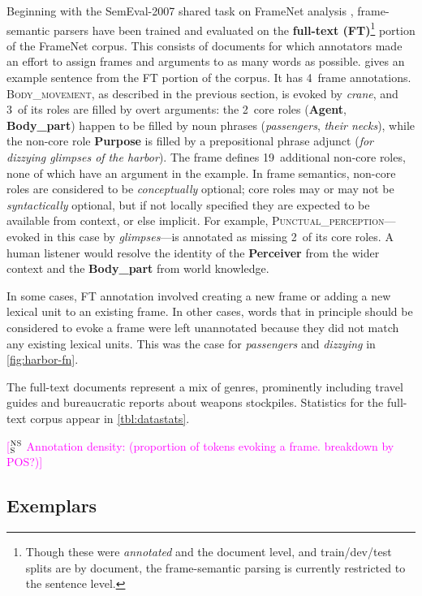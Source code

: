 \documentclass[11pt,a4paper]{article}
\newcommand{\ensuretext}[1]{#1}
\newcommand{\nssmarker}{\ensuretext{\textcolor{magenta}{\ensuremath{^{\textsc{NS}}_{\textsc{S}}}}}}
\newcommand{\arkcomment}[3]{\ensuretext{\textcolor{#3}{[#1 #2]}}}
\newcommand{\nss}[1]{\arkcomment{\nssmarker}{#1}{magenta}}
\newcommand{\fnf}[1]{\textsc{\textsf{#1}}} %
\newcommand{\fnr}[1]{\textbf{\textsf{#1}}} %
\begin{document}
Beginning with the SemEval-2007 shared task on FrameNet analysis \citep{baker-07},
frame-semantic parsers have been trained and evaluated on the \textbf{full-text (FT)}\footnote{Though these 
were \emph{annotated} and the document level, and train/dev/test splits are by document, the frame-semantic parsing 
is currently restricted to the sentence level.} portion 
of the FrameNet corpus. This consists of documents for which annotators made an effort 
to assign frames and arguments to as many words as possible. 
 gives an example sentence from the FT portion of the corpus. 
It has 4~frame annotations. \fnf{Body\_movement}, as described in the previous section, 
is evoked by \textit{crane}, and 3~of its roles are filled by overt arguments: 
the 2~core roles (\fnr{Agent}, \fnr{Body\_part}) happen to be filled by noun phrases 
(\textit{passengers}, \textit{their necks}), while the non-core role \fnr{Purpose} is filled by a 
prepositional phrase adjunct (\textit{for dizzying glimpses of the harbor}).
The frame defines 19~additional non-core roles, none of which have an argument in the example.
In frame semantics, non-core roles are considered to be \emph{conceptually} optional; 
core roles may or may not be \emph{syntactically} optional, but if not locally specified they are 
expected to be available from context, or else implicit.
For example, \fnf{Punctual\_perception}---evoked in this case by \textit{glimpses}---is annotated 
as missing 2~of its core roles. A human listener would resolve the identity of the \fnr{Perceiver} 
from the wider context and the \fnr{Body\_part} from world knowledge. 

In some cases, FT annotation involved creating a new frame or adding a new lexical unit to an existing frame. 
In other cases, words that in principle should be considered to evoke a frame were left unannotated 
because they did not match any existing lexical units. 
This was the case for \textit{passengers} and \textit{dizzying} in \cref{fig:harbor-fn}.

The full-text documents represent a mix of genres, prominently including travel guides 
and bureaucratic reports about weapons stockpiles. 
Statistics for the full-text corpus appear in \cref{tbl:datastats}.

\nss{Annotation density: (proportion of tokens evoking a frame. breakdown by POS?)}

\subsection{Exemplars}\label{sec:exemplars}
\end{document}
